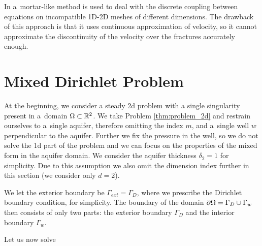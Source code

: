 In \cite{brezina_2012} a~mortar-like method is used to deal with the discrete coupling between equations on incompatible 1D-2D meshes 
of different dimensions. The drawback of this approach is that it uses continuous approximation of velocity, so
it cannot approximate the discontinuity of the velocity over the fractures accurately enough.


\section{Mixed Dirichlet Problem}

At the beginning, we consider a steady 2d problem with a single singularity present in a~domain $\Omega\subset\mathbb{R}^2$.
We take Problem \ref{thm:problem_2d} and restrain ourselves to a~single aquifer, therefore omitting the index $m$,
and a~single well $w$ perpendicular to the aquifer. Further we fix the pressure in the well,
so we do not solve the 1d part of the problem
and we can focus on the properties of the mixed form in the aquifer domain.
We consider the aquifer thickness $\delta_2=1$ for simplicity.
Due to this assumption we also omit the dimension index further in this section (we consider only $d=2$).

We let the exterior boundary be  $\Gamma_{ext}=\Gamma_D$, where we prescribe the Dirichlet boundary condition, for simplicity.
The boundary of the domain $\partial\Omega=\Gamma_D \cup \Gamma_w$ then consists of only two parts: the exterior boundary $\Gamma_D$
and the interior boundary $\Gamma_w$.

Let us now solve

